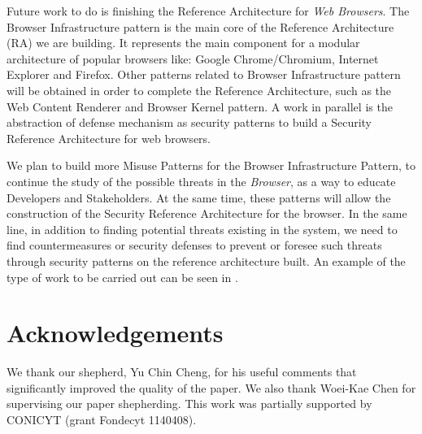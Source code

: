\documentclass{sig-alternate-05-2015}
\begin{document}
Future work to do is finishing the Reference Architecture for \textit{Web Browsers}. The Browser Infrastructure pattern is the main core of the Reference Architecture (RA) we are building. It represents the main component for a modular architecture of popular browsers like: Google Chrome/Chromium, Internet Explorer and Firefox. Other patterns related to Browser Infrastructure pattern will be obtained in order to complete the Reference Architecture, such as the Web Content Renderer and Browser Kernel pattern. A work in parallel is the abstraction of defense mechanism as security patterns to build a Security Reference Architecture for web browsers.

We plan to build more Misuse Patterns for the Browser Infrastructure Pattern, to continue the study of the possible threats in the \textit{Browser}, as a way to educate Developers and Stakeholders. At the same time, these patterns will allow the construction of the Security Reference Architecture for the browser. In the same line, in addition to finding potential threats existing in the system, we need to find countermeasures or security defenses to prevent or foresee such threats through security patterns on the reference architecture built. An example of the type of work to be carried out can be seen in \cite{Fernandez2015}.

\section{Acknowledgements}
We thank our shepherd, Yu Chin Cheng, for his useful comments that significantly improved the quality of the paper. We also thank Woei-Kae Chen for supervising our paper shepherding. This work was partially supported by CONICYT (grant Fondecyt 1140408).


  

\end{document}
